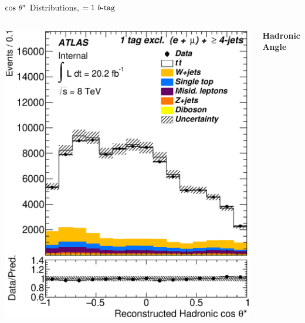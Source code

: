 \documentclass{beamer}
\begin{document}
{\begin{frame}{$\lowercase{\text{cos}}~\theta^*$ Distributions, $=1\text{ } \lowercase{ b\text{-tag}}$}
\begin{columns}
      \includegraphics[width=\textwidth]{../chapters/whel/figures/control_Plots2/elmu_1excl_LH48/CosTheta_reco_had_elmu}\\
      \vspace{-10pt}\begin{center}\textbf{Hadronic Angle}\end{center}
    \end{columns}
  \end{frame}

}
\end{document}

